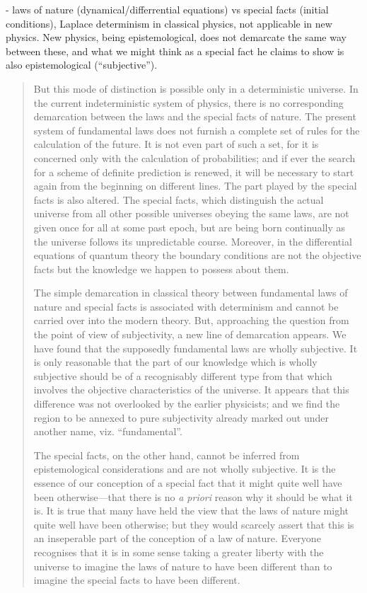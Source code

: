 - laws of nature (dynamical/differrential equations) vs special facts (initial conditions), Laplace determinism in classical physics, not applicable in new physics.  New physics, being epistemological, does not demarcate the same way between these, and what we might think as a special fact he claims to show is also epistemological (``subjective'').

\begin{quote}
    But this mode of distinction is possible only in a deterministic universe.  In the current indeterministic system of physics, there is no corresponding demarcation between the laws and the special facts of nature.  The present system of fundamental laws does not furnish a complete set of rules for the calculation of the future.  It is not even part of such a set, for it is concerned only with the calculation of probabilities; and if ever the search for a scheme of definite prediction is renewed, it will be necessary to start again from the beginning on different lines.  The part played by the special facts is also altered.  The special facts, which distinguish the actual universe from all other possible universes obeying the same laws, are not given once for all at some past epoch, but are being born continually as the universe follows its unpredictable course.  Moreover, in the differential equations of quantum theory the boundary conditions are not the objective facts but the knowledge we happen to possess about them.
    
    The simple demarcation in classical theory between fundamental laws of nature and special facts is associated with determinism and cannot be carried over into the modern theory.  But, approaching the question from the point of view of subjectivity, a new line of demarcation appears.  We have found that the supposedly fundamental laws are wholly subjective.  It is only reasonable that the part of our knowledge which is wholly subjective should be of a recognisably different type from that which involves the objective characteristics of the universe.  It appears that this difference was not overlooked by the earlier physicists; and we find the region to be annexed to pure subjectivity already marked out under another name, viz. ``fundamental''.
    
    The special facts, on the other hand, cannot be inferred from epistemological considerations and are not wholly subjective.  It is the essence of our conception of a special fact that it might quite well have been otherwise---that there is no \emph{a priori} reason why it should be what it is.  It is true that many have held the view that the laws of nature might quite well have been otherwise; but they would scarcely assert that this is an inseperable part of the conception of a law of nature.  Everyone recognises that it is in some sense taking a greater liberty with the universe to imagine the laws of nature to have been different than to imagine the special facts to have been different.
    

\end{quote}
